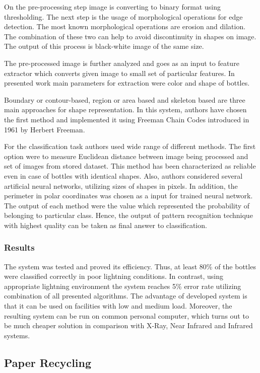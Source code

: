 \documentclass{lutmscthesis}[2010/09/22]
\begin{document}
On the pre-processing step image is converting
to binary format using thresholding. The next step is
the usage of morphological operations for
edge detection. The most known morphological operations
are erosion and dilation. The combination of these
two can help to avoid discontinuity in shapes
on image. The output of this process is black-white
image of the same size.

The pre-processed image is further analyzed and
goes as an input to feature extractor which converts
given image to small set of particular features. In presented
work main parameters for extraction were color and
shape of bottles.

Boundary or contour-based, region or area based and skeleton based
are three main approaches for shape representation.
In this system, authors have chosen the first method
and implemented it using Freeman Chain Codes introduced
in 1961 by Herbert Freeman.

For the classification task authors used wide range of different
methods. The first option were to measure Euclidean distance between
image being processed and set of images from stored
dataset. This method has been characterized as reliable
even in case of bottles with identical shapes. Also,
authors considered several artificial neural networks,
utilizing sizes of shapes in pixels. In addition,
the perimeter in polar coordinates was chosen
as a input for trained neural network. The output
of each method were the value which represented
the probability of belonging to particular class. Hence, the
output of pattern recognition technique with highest quality
can be taken as final answer to classification.

\subsubsection*{ Results }

The system was tested and proved its efficiency. Thus,
at least 80\% of the bottles were classified correctly
in poor lightning conditions. In contrast, using
appropriate lightning environment the system reaches
5\% error rate utilizing combination of all presented
algorithms. The advantage of developed system is that
it can be used on facilities with low and medium
load. Moreover, the resulting system can be run
on common personal computer, which turns out
to be much cheaper solution in comparison with
X-Ray, Near Infrared and Infrared systems.

\subsection{ Paper Recycling }
\end{document}
